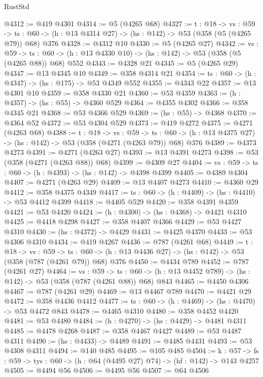 \begin{lexlean}{RustStd}
\begin{coremodule}
@4312 := @419 @4301
@4314 := @5 (@4265 @68)
@4327 := {t : @18} ->
  {vs : @59} ->
  {ts : @60} -> (h : @13 @4314 @27) -> (hs : @142) -> @53 (@358 (@5 (@4265 @79)) @68) @376
@4328 := @4312 @10
@4330 := @5 (@4265 @27)
@4342 := {vs : @59} ->
  {ts : @60} -> (h : @13 @4330 @10) -> (hs : @142) -> @53 (@358 (@5 (@4265 @88)) @68) @552
@4343 := @4328 @21
@4345 := @5 (@4265 @29)
@4347 := @13 @4345 @10
@4349 := @358 @4314 @21
@4354 := {ts : @60} -> (h : @4347) -> (hs : @175) -> @53 @4349 @552
@4355 := @4343 @22
@4357 := @13 @4301 @10
@4359 := @358 @4330 @21
@4360 := @53 @4359
@4363 := (h : @4357) -> (hs : @55) -> @4360 @529
@4364 := @4355 @4302
@4366 := @358 @4345 @21
@4368 := @53 @4366 @529
@4369 := (hs : @55) -> @4368
@4370 := @4364 @52
@4372 := @53 @4304 @529
@4373 := @419 @4272
@4375 := @4271 (@4263 @68)
@4388 := {t : @18} ->
  {vs : @59} ->
  {ts : @60} -> (h : @13 @4375 @27) -> (hs : @142) -> @53 (@358 (@4271 (@4263 @79)) @68) @376
@4389 := @4373 @4273
@4391 := @4271 (@4263 @27)
@4393 := @13 @4391 @4273
@4398 := @53 (@358 (@4271 (@4263 @88)) @68)
@4399 := @4309 @27
@4404 := {vs : @59} -> {ts : @60} -> (h : @4393) -> (hs : @142) -> @4398 @4399
@4405 := @4389 @4304
@4407 := @4271 (@4263 @29)
@4409 := @13 @4407 @4273
@4410 := @4360 @29
@4412 := @358 @4375 @4349
@4417 := {ts : @60} -> (h : @4409) -> (hs : @4410) -> @53 @4412 @4399
@4418 := @4405 @529
@4420 := @358 @4391 @4359
@4421 := @53 @4420
@4424 := (h : @4300) -> (hs : @4368) -> @4421 @4310
@4425 := @4418 @4298
@4427 := @358 @4407 @4366
@4429 := @53 @4427 @4310
@4430 := (hs : @4372) -> @4429
@4431 := @4425 @4370
@4433 := @53 @4306 @4310
@4434 := @419 @4267
@4436 := @787 (@4261 @68)
@4449 := {t : @18} ->
  {vs : @59} ->
  {ts : @60} -> (h : @13 @4436 @27) -> (hs : @142) -> @53 (@358 (@787 (@4261 @79)) @68) @376
@4450 := @4434 @789
@4452 := @787 (@4261 @27)
@4464 := {vs : @59} ->
  {ts : @60} -> (h : @13 @4452 @789) -> (hs : @142) -> @53 (@358 (@787 (@4261 @88)) @68) @843
@4465 := @4450 @4306
@4467 := @787 (@4261 @29)
@4469 := @13 @4467 @789
@4470 := @4421 @29
@4472 := @358 @4436 @4412
@4477 := {ts : @60} -> (h : @4469) -> (hs : @4470) -> @53 @4472 @843
@4478 := @4465 @4310
@4480 := @358 @4452 @4420
@4481 := @53 @4480
@4484 := (h : @4270) -> (hs : @4429) -> @4481 @4311
@4485 := @4478 @4268
@4487 := @358 @4467 @4427
@4489 := @53 @4487 @4311
@4490 := (hs : @4433) -> @4489
@4491 := @4485 @4431
@4493 := @53 @4308 @4311
@4494 := @140 @485
@4495 := @105 @485
@4504 := {k : @57} ->
  {fs : @59} -> {tys : @60} -> (h : @64 (@4495 @27) @74) -> (hf : @142) -> @143 @4257
@4505 := @4494 @56
@4506 := @4495 @56
@4507 := @64 @4506

\end{coremodule}
\end{lexlean}
